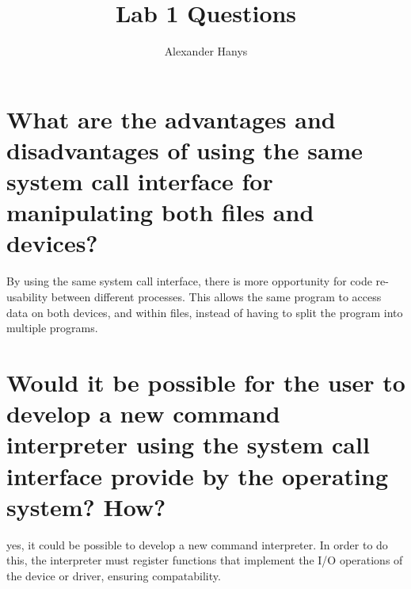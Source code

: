 \documentclass{article}
\title{Lab 1 Questions}
\author{Alexander Hanys}
\begin{document}
\maketitle


\section{What are the advantages and disadvantages of using the same system call interface for manipulating both files and devices?}

By using the same system call interface, there is more opportunity for code re-usability between different processes. This allows the same program to access data on both devices, and within files, instead of having to split the program into multiple programs.

\section{Would it be possible for the user to develop a new command interpreter using the system call interface provide by the operating system? How?}

yes, it could be possible to develop a new command interpreter. In order to do this, the interpreter must register functions that implement the I/O operations of the device or driver, ensuring compatability. 
\end{document}
